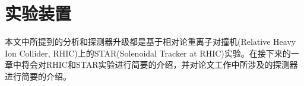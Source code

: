 

\setcounter{section}{0}



\setcounter{figure}{0}
\setcounter{table}{0}
\setcounter{equation}{0}




\chapter{实验装置}
本文中所提到的分析和探测器升级都是基于相对论重离子对撞机(Relative Heavy Ion Collider, RHIC)上的STAR(Solenoidal Tracker at RHIC)实验。在接下来的一章中将会对RHIC和STAR实验进行简要的介绍，并对论文工作中所涉及的探测器进行简要的介绍。


